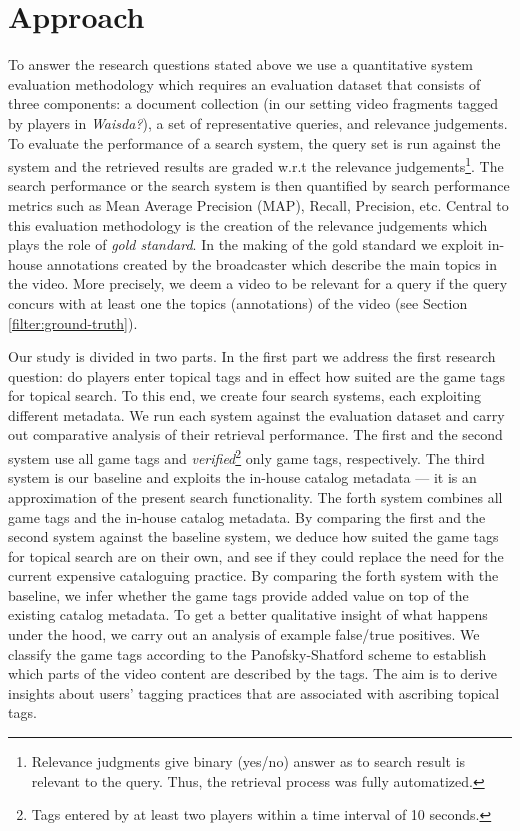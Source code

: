 \section{Approach}\label{sec:topicir-filter:approach}
To answer the research questions stated above we use a quantitative system evaluation methodology \cite{vorhees} which requires an evaluation dataset that consists of three components: a document collection (in our setting video fragments tagged by players in \textit{Waisda?}), a set of representative queries, and relevance judgements. To evaluate the performance of a search system, the query set is run against the system and the retrieved results are graded w.r.t the relevance judgements\footnote{Relevance judgments give binary (yes/no) answer as to search result is relevant to the query. Thus, the retrieval process was fully automatized.}. The search performance or the search system is then quantified by search performance metrics such as Mean Average Precision (MAP), Recall,
Precision, etc. Central to this evaluation methodology is the creation of the relevance judgements which plays the role of \textit{gold standard}. In the making of the gold standard we exploit in-house annotations created by the broadcaster which describe the main topics in the video. More precisely, we deem a video to be relevant for a query if the query concurs with at least one the topics (annotations) of the video (see Section \ref{filter:ground-truth}).

Our study is divided in two parts. In the first part we address the first research question: do players enter topical tags and in effect how suited are the game tags for topical search. To this end, we create four search systems, each exploiting different metadata. We run each system against the evaluation dataset and carry out comparative analysis of their retrieval performance. The first and the second system use all game tags and \textit{verified}\footnote{Tags entered by at least two players within a time interval of 10 seconds.} only game tags, respectively. The third system is our baseline and exploits the in-house catalog metadata --- it is an approximation of the present search functionality. The forth system combines all game tags and the in-house catalog metadata. By comparing the first and the second system against the baseline system, we deduce how suited the game tags for topical search are on their own, and see if they could replace the need for the current expensive cataloguing practice. By comparing the forth system with the baseline, we infer whether the game tags provide added value on top of the existing catalog metadata. 
To get a better qualitative insight of what happens under the hood, we carry out an analysis of example false/true positives. We classify the game tags according to the Panofsky-Shatford scheme \cite{laurapaper} to establish which parts of the video content are described by the tags. The aim is to derive insights about users' tagging practices that are associated with ascribing topical tags. 


